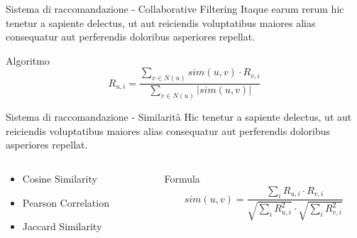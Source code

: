 \documentclass{beamer}
\begin{document}
	\begin{frame}{Sistema di raccomandazione - Collaborative Filtering}
		Itaque earum rerum hic tenetur a sapiente delectus, ut aut reiciendis voluptatibus maiores alias consequatur aut perferendis doloribus asperiores repellat.

		\begin{block}{Algoritmo}
			$$ R_{u,i} = \frac{\sum_{v \in N(u)} sim(u,v) \cdot R_{v,i}}{\sum_{v \in N(u)} |sim(u,v)|} $$
		\end{block}
	\end{frame}

	\begin{frame}{Sistema di raccomandazione - Similarità}
		Hic tenetur a sapiente delectus, ut aut reiciendis voluptatibus maiores alias consequatur aut perferendis doloribus asperiores repellat.

		\begin{columns}
			\begin{column}{0.6\textwidth}
				\begin{itemize}
					\item Cosine Similarity
					\item Pearson Correlation
					\item Jaccard Similarity
				\end{itemize}
			\end{column}
			\begin{column}{0.4\textwidth}
				\begin{exampleblock}{Formula}
					$$ sim(u,v) = \frac{\sum_{i} R_{u,i} \cdot R_{v,i}}{\sqrt{\sum_{i} R_{u,i}^2} \cdot \sqrt{\sum_{i} R_{v,i}^2}} $$
				\end{exampleblock}
			\end{column}
		\end{columns}
	\end{frame}
\end{document}
